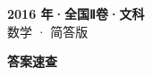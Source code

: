 \documentclass[zihao=-4, a4paper]{ctexart}
\begin{document}
\begin{center}
  {\Large\bfseries 2016 年·全国Ⅱ卷·文科}\\[4pt]
  {\large 数学 · 简答版}
\end{center}
\medskip
{}

\clearpage
{}
\begin{center}{\Large\bfseries 答案速查}\end{center}
\medskip

\end{document}
